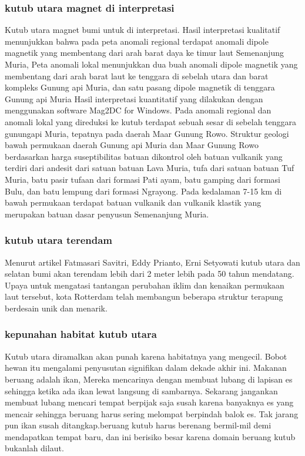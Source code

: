 \subsubsection{kutub utara magnet di interpretasi}
		Kutub utara magnet bumi untuk di interpretasi. Hasil interpretasi kualitatif menunjukkan bahwa pada peta anomali regional terdapat anomali dipole 
	magnetik yang membentang dari arah barat daya ke timur laut Semenanjung Muria, Peta anomali lokal menunjukkan dua buah anomali dipole magnetik yang 
	membentang dari arah barat laut ke tenggara di sebelah utara dan barat kompleks Gunung api Muria, dan satu pasang dipole magnetik di tenggara Gunung api
	Muria Hasil interpretasi kuantitatif yang dilakukan dengan menggunakan software Mag2DC for Windows. Pada anomali regional dan anomali lokal yang direduksi
	ke kutub terdapat sebuah sesar di sebelah tenggara gunungapi Muria, tepatnya pada daerah Maar Gunung Rowo. Struktur geologi bawah permukaan daerah 
	Gunung api Muria dan Maar Gunung Rowo berdasarkan harga suseptibilitas batuan dikontrol oleh batuan vulkanik yang terdiri dari andesit dari 
	satuan batuan Lava Muria, tufa dari satuan batuan Tuf Muria, batu pasir tufaan dari formasi Pati ayam, batu gamping dari formasi Bulu, dan 
	batu lempung dari formasi Ngrayong. Pada kedalaman 7-15 km di bawah permukaan terdapat batuan vulkanik dan vulkanik klastik yang merupakan 
	batuan dasar penyusun Semenanjung Muria.
	
\subsubsection {kutub utara terendam}

		Menurut artikel Fatmasari Savitri, Eddy Prianto, Erni Setyowati kutub utara dan selatan bumi akan terendam lebih dari 2 meter lebih pada 50 
	tahun mendatang. Upaya untuk mengatasi tantangan perubahan iklim dan kenaikan permukaan laut tersebut, kota Rotterdam telah membangun beberapa 
	struktur terapung berdesain unik dan menarik. 

\subsubsection {kepunahan habitat kutub utara}
		Kutub utara diramalkan akan punah karena habitatnya yang mengecil. Bobot hewan itu mengalami penyusutan signifikan dalam dekade akhir ini.
	Makanan beruang adalah ikan, Mereka mencarinya dengan membuat lubang di lapisan es sehingga ketika ada ikan lewat langsung di sambarnya. Sekarang jangankan membuat lubang mencari tempat berpijak saja susah karena banyaknya es yang mencair sehingga beruang harus sering melompat berpindah balok es. Tak jarang pun ikan susah ditangkap.beruang kutub harus berenang bermil-mil demi mendapatkan tempat baru, dan ini berisiko besar karena domain beruang kutub bukanlah dilaut.
	
		


